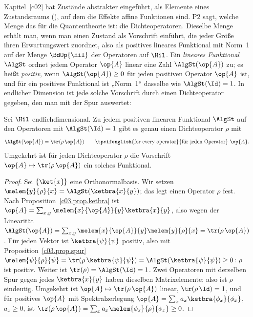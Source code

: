 Kapitel~\ref{c02} hat Zustände abstrakter eingeführt, als Elemente eines Zustandsraums
(), auf dem die Effekte affine Funktionen sind. P2 sagt, welche Menge das für die
Quantentheorie ist: die Dichteoperatoren. Dieselbe Menge erhält man, wenn man einen Zustand als
Vorschrift einführt, die jeder Größe ihren Erwartungswert zuordnet, also als positives lineares
Funktional mit Norm~1 auf der Menge $\BdOp{\Hil}$ der Operatoren auf $\Hil$. Ein \emph{lineares
Funktional} $\AlgSt$ ordnet jedem Operator $\op{A}$ linear eine Zahl $\AlgSt(\op{A})$ zu; es heißt
\emph{positiv}, wenn $\AlgSt(\op{A}) \geq 0$ für jeden positiven Operator $\op{A}$ ist, und für ein
positives Funktional ist „Norm~1“ dasselbe wie $\AlgSt(\Id) = 1$. In endlicher Dimension ist jede
solche Vorschrift durch einen Dichteoperator gegeben, den man mit der Spur auswertet:

\begin{proposition}\label{c04.prop.funktionale}
  Sei $\Hil$ endlichdimensional. Zu jedem positiven linearen Funktional $\AlgSt$ auf den Operatoren
  mit $\AlgSt(\Id) = 1$ gibt es genau einen Dichteoperator $\rho$ mit
  \begin{equation}\label{c04.eq.funktional}
    \AlgSt(\op{A}) = \tr(\rho\, \op{A}) \qquad \text{\tpcifenglish{for every operator}{für jeden Operator}}\ \op{A} .
  \end{equation}
  Umgekehrt ist für jeden Dichteoperator $\rho$ die Vorschrift $\op{A} \mapsto \tr(\rho\,\op{A})$ ein
  solches Funktional.
\end{proposition}
\begin{proof}
  Sei $\{\ket{x}\}$ eine Orthonormalbasis. Wir setzen $\melem{y}{\rho}{x} = \AlgSt(\ketbra{x}{y})$;
  das legt einen Operator $\rho$ fest. Nach Proposition~\ref{c03.prop.ketbra} ist
  $\op{A} = \sum_{x,y} \melem{x}{\op{A}}{y} \ketbra{x}{y}$, also wegen der Linearität
  $\AlgSt(\op{A}) = \sum_{x,y} \melem{x}{\op{A}}{y}\melem{y}{\rho}{x} = \tr(\rho\,\op{A})$. Für jeden
  Vektor ist $\ketbra{\psi}{\psi}$ positiv, also mit Proposition~\ref{c03.prop.spur}
  $\melem{\psi}{\rho}{\psi} = \tr(\rho\,\ketbra{\psi}{\psi}) = \AlgSt(\ketbra{\psi}{\psi}) \geq 0$: $\rho$ ist
  positiv. Weiter ist $\tr(\rho) = \AlgSt(\Id) = 1$. Zwei Operatoren mit derselben Spur gegen jedes
  $\ketbra{x}{y}$ haben dieselben Matrixelemente; also ist $\rho$ eindeutig. Umgekehrt ist
  $\op{A} \mapsto \tr(\rho\,\op{A})$ linear, $\tr(\rho\,\Id) = 1$, und für positives $\op{A}$ mit
  Spektralzerlegung $\op{A} = \sum_x a_x \ketbra{\phi_x}{\phi_x}$, $a_x \geq 0$, ist
  $\tr(\rho\,\op{A}) = \sum_x a_x \melem{\phi_x}{\rho}{\phi_x} \geq 0$.
\end{proof}

